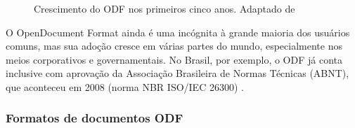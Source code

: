 \begin{figure}[ht]
    \centering
    \caption{Crescimento do ODF nos primeiros cinco anos. Adaptado de \cite{SILVA}}
    \label{crescimento_odf}
\end{figure}

\begin{citacao}
O OpenDocument Format ainda é uma incógnita à grande maioria dos usuários comuns, mas sua adoção cresce em várias partes do mundo, especialmente nos meios corporativos e governamentais. No Brasil, por exemplo, o ODF já conta inclusive com aprovação da Associação Brasileira de Normas Técnicas (ABNT), que aconteceu em 2008 (norma NBR ISO/IEC 26300)
\cite{ALECRIM-ODF}.
\end{citacao}

\subsubsection{Formatos de documentos ODF}

